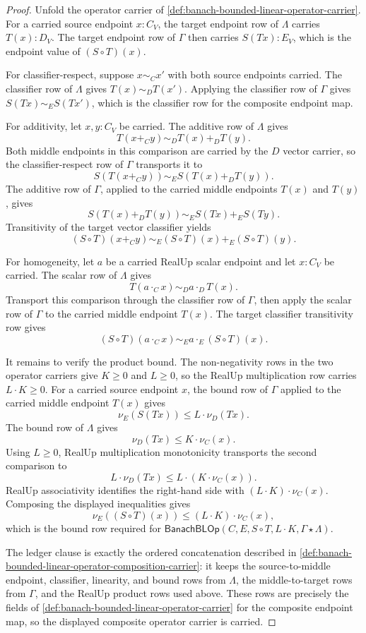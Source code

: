 \begin{proof}
Unfold the operator carrier of
\autoref{def:banach-bounded-linear-operator-carrier}. For a carried source
endpoint $x:C_V$, the target endpoint row of $\Lambda$ carries $T(x):D_V$.
The target endpoint row of $\Gamma$ then carries $S(Tx):E_V$, which is the
endpoint value of $(S\circ T)(x)$.

For classifier-respect, suppose $x\sim_C x'$ with both source endpoints
carried. The classifier row of $\Lambda$ gives $T(x)\sim_D T(x')$. Applying
the classifier row of $\Gamma$ gives $S(Tx)\sim_E S(Tx')$, which is the
classifier row for the composite endpoint map.

For additivity, let $x,y:C_V$ be carried. The additive row of $\Lambda$ gives
$$
T(x+_C y)\sim_D T(x)+_D T(y).
$$
Both middle endpoints in this comparison are carried by the $D$ vector
carrier, so the classifier-respect row of $\Gamma$ transports it to
$$
S(T(x+_C y))\sim_E S(T(x)+_D T(y)).
$$
The additive row of $\Gamma$, applied to the carried middle endpoints $T(x)$
and $T(y)$, gives
$$
S(T(x)+_D T(y))\sim_E S(Tx)+_E S(Ty).
$$
Transitivity of the target vector classifier yields
$$
(S\circ T)(x+_C y)\sim_E (S\circ T)(x)+_E(S\circ T)(y).
$$

For homogeneity, let $a$ be a carried RealUp scalar endpoint and let
$x:C_V$ be carried. The scalar row of $\Lambda$ gives
$$
T(a\cdot_C x)\sim_D a\cdot_D T(x).
$$
Transport this comparison through the classifier row of $\Gamma$, then apply
the scalar row of $\Gamma$ to the carried middle endpoint $T(x)$. The target
classifier transitivity row gives
$$
(S\circ T)(a\cdot_C x)\sim_E a\cdot_E(S\circ T)(x).
$$

It remains to verify the product bound. The non-negativity rows in the two
operator carriers give $K\ge 0$ and $L\ge 0$, so the RealUp multiplication row
carries $L\cdot K\ge 0$. For a carried source endpoint $x$, the bound row of
$\Gamma$ applied to the carried middle endpoint $T(x)$ gives
$$
\nu_E(S(Tx))\le L\cdot\nu_D(Tx).
$$
The bound row of $\Lambda$ gives
$$
\nu_D(Tx)\le K\cdot\nu_C(x).
$$
Using $L\ge 0$, RealUp multiplication monotonicity transports the second
comparison to
$$
L\cdot\nu_D(Tx)\le L\cdot(K\cdot\nu_C(x)).
$$
RealUp associativity identifies the right-hand side with
$(L\cdot K)\cdot\nu_C(x)$. Composing the displayed inequalities gives
$$
\nu_E((S\circ T)(x))\le (L\cdot K)\cdot\nu_C(x),
$$
which is the bound row required for
$\mathsf{BanachBLOp}(C,E,S\circ T,L\cdot K,\Gamma\star\Lambda)$.

The ledger clause is exactly the ordered concatenation described in
\autoref{def:banach-bounded-linear-operator-composition-carrier}: it keeps the
source-to-middle endpoint, classifier, linearity, and bound rows from
$\Lambda$, the middle-to-target rows from $\Gamma$, and the RealUp product
rows used above. These rows are precisely the fields of
\autoref{def:banach-bounded-linear-operator-carrier} for the composite
endpoint map, so the displayed composite operator carrier is carried.
\end{proof}

